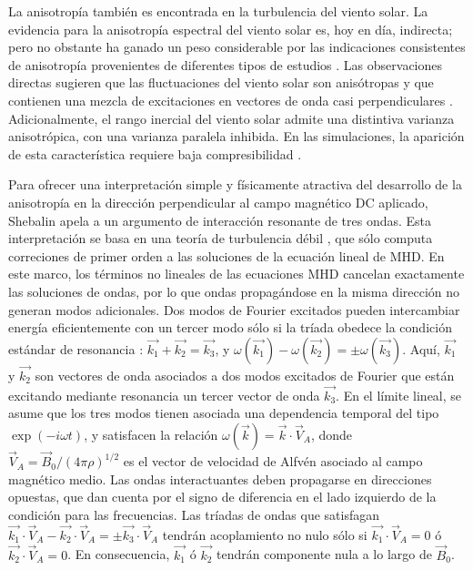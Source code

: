 La anisotropía también es encontrada en la turbulencia del viento
solar. La evidencia para la anisotropía espectral del viento solar es,
hoy en día, indirecta; pero no obstante ha ganado un peso considerable
por las indicaciones consistentes de anisotropía provenientes de
diferentes tipos de estudios \cite{matthaeus_unquiet_1995}. Las
observaciones directas sugieren que las fluctuaciones del viento solar
son anisótropas \cite{carbone_model_1995} y que contienen una mezcla
de excitaciones en vectores de onda casi perpendiculares
\cite{bieber_dominant_1996}. Adicionalmente, el rango inercial del
viento solar admite una distintiva varianza anisotrópica, con una
varianza paralela inhibida. En las simulaciones, la aparición de esta
característica requiere baja compresibilidad
\cite{matthaeus_anisotropic_1996}.

Para ofrecer una interpretación simple y físicamente atractiva del
desarrollo de la anisotropía en la dirección perpendicular al campo
magnético DC aplicado, Shebalin \cite{shebalin_anisotropy_1983} apela
a un argumento de interacción resonante de tres ondas. Esta
interpretación se basa en una teoría de turbulencia débil
\cite{zakharov_kolmogorov_1992}, que sólo computa correciones de
primer orden a las soluciones de la ecuación lineal de MHD. En este
marco, los términos no lineales de las ecuaciones MHD cancelan
exactamente las soluciones de ondas, por lo que ondas propagándose en
la misma dirección no generan modos adicionales. Dos modos de Fourier
excitados pueden intercambiar energía eficientemente con un tercer
modo sólo si la tríada obedece la condición estándar de resonancia
\cite{montgomery_anisotropic_1995}: $\vec{k_1} + \vec{k_2} =
\vec{k_3}$, y $\omega(\vec{k_1}) - \omega(\vec{k_2}) = \pm
\omega(\vec{k_3})$. Aquí, $\vec{k_1}$ y $\vec{k_2}$ son vectores de
onda asociados a dos modos excitados de Fourier que están excitando
mediante resonancia un tercer vector de onda $\vec{k_3}$. En el límite
lineal, se asume que los tres modos tienen asociada una dependencia
temporal del tipo $\exp(-i\omega t)$, y satisfacen la relación
$\omega(\vec{k}) = \vec{k}\cdot\vec{V}_A$, donde $\vec{V}_A =
\vec{B}_0/(4\pi\rho)^{1/2}$ es el vector de velocidad de Alfv\'en
asociado al campo magnético medio. Las ondas interactuantes deben
propagarse en direcciones opuestas, que dan cuenta por el signo de
diferencia en el lado izquierdo de la condición para las
frecuencias. Las tríadas de ondas que satisfagan $\vec{k_1}\cdot
\vec{V}_A - \vec{k_2}\cdot \vec{V}_A = \pm \vec{k_3}\cdot \vec{V}_A$
tendrán acoplamiento no nulo sólo si $\vec{k_1}\cdot \vec{V}_A = 0$ ó
$\vec{k_2}\cdot \vec{V}_A = 0$. En consecuencia, $\vec{k_1}$ ó
$\vec{k_2}$ tendrán componente nula a lo largo de $\vec{B}_0$.

